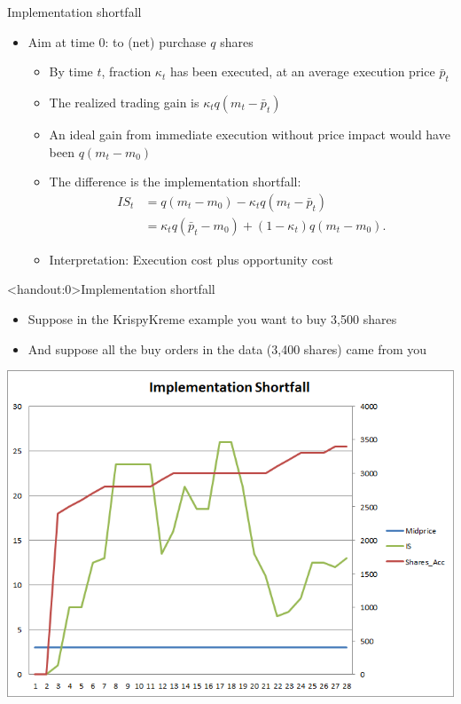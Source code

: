 \documentclass[english,10pt
,aspectratio=169
]{beamer}
\begin{document}
\begin{frame}{Implementation shortfall}
	\begin{itemize}
		\item Aim at time 0: to (net) purchase $q$ shares
		\begin{itemize}
			\item By time $t$, fraction $\kappa_t$ has been executed, at an average execution price $\bar{p}_t$
			\item The realized trading gain is $\kappa_t q(m_t-\bar{p}_t)$
			\item An ideal gain from immediate execution without price impact would have been $q(m_t - m_0)$
			\item The difference is the \alert{implementation shortfall}:
			\begin{align*}
			IS_t 
			& = q(m_t-m_0) - \kappa_t q (m_t - \bar{p}_t) \\
			& = \kappa_t q(\bar{p}_t - m_0) + (1-\kappa_t) q (m_t - m_0).
			\end{align*}
			\item Interpretation: Execution cost plus opportunity cost
		\end{itemize}
	\end{itemize}
\end{frame}


\begin{frame}<handout:0>{Implementation shortfall}
	\begin{itemize}
		\item Suppose in the KrispyKreme example you want to buy 3,500 shares
		\item And suppose all the buy orders in the data (3,400 shares) came from you
	\end{itemize}
	\center
	\includegraphics[scale=0.39]{pics/L2_is}
\end{frame}
\end{document}
